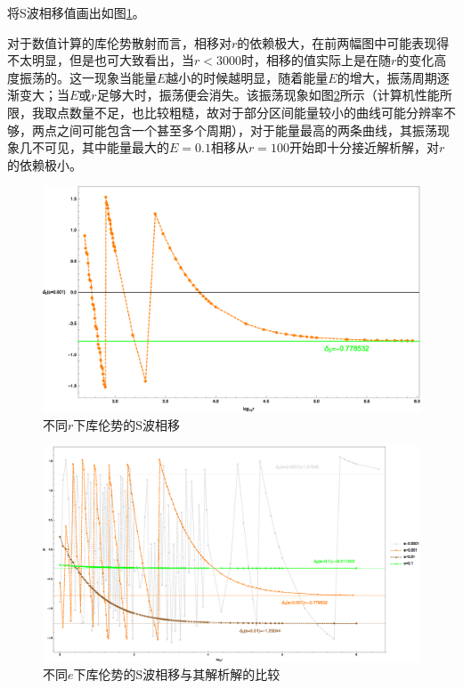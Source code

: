 \documentclass[hyperref,cs4size,titlepage,twoside]{ctexart}
\begin{document}
将S波相移值画出如图\ref{sps1}。

对于数值计算的库伦势散射而言，相移对$r$的依赖极大，在前两幅图中可能表现得不太明显，但是也可大致看出，当$r<3000$时，相移的值实际上是在随$r$的变化高度振荡的。这一现象当能量$E$越小的时候越明显，随着能量$E$的增大，振荡周期逐渐变大；当$E$或$r$足够大时，振荡便会消失。该振荡现象如图\ref{sps3}所示（计算机性能所限，我取点数量不足，也比较粗糙，故对于部分区间能量较小的曲线可能分辨率不够，两点之间可能包含一个甚至多个周期），对于能量最高的两条曲线，其振荡现象几不可见，其中能量最大的$E=0.1$相移从$r=100$开始即十分接近解析解，对$r$的依赖极小。
\begin{figure}[!htbp]
  \centering
  \includegraphics[width=6.2in]{Test_PhaseShift_NA_Coulomb_bothphasealter.eps}
  \caption{不同$r$下库伦势的S波相移}\label{sps1}
\end{figure}
\begin{figure}[!htbp]
  \centering
  \includegraphics[width=6.2in]{Test_PhaseShift_NA_Coulomb_etest.eps}
  \caption{不同$e$下库伦势的S波相移与其解析解的比较}\label{sps3}
\end{figure}
\end{document}
